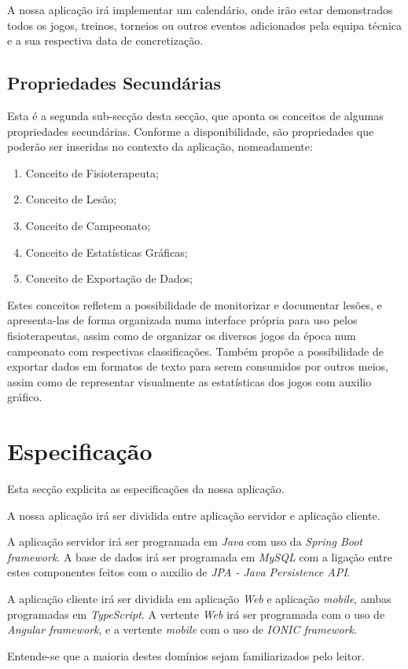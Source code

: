 A nossa aplicação irá implementar um calendário, onde irão estar demonstrados todos os jogos, treinos, torneios ou outros eventos adicionados pela equipa técnica e a sua respectiva data de concretização.



\subsection{Propriedades Secundárias} \label{sec222}
Esta é a segunda sub-secção desta secção, que aponta os conceitos de algumas propriedades secundárias. Conforme a disponibilidade, são propriedades que poderão ser inseridas no contexto da aplicação, nomeadamente:
\begin{enumerate}
	\item Conceito de Fisioterapeuta;
	\item Conceito de Lesão;
	\item Conceito de Campeonato;
	\item Conceito de Estatísticas Gráficas;
	\item Conceito de Exportação de Dados;
\end{enumerate}

Estes conceitos refletem a possibilidade de monitorizar e documentar lesões, e apresenta-las de forma organizada numa interface própria para uso pelos fisioterapeutas, assim como de organizar os diversos jogos da época num campeonato com respectivas classificações. Também propõe a possibilidade de exportar dados em formatos de texto para serem consumidos por outros meios, assim como de representar visualmente as estatísticas dos jogos com auxilio gráfico.

\section{Especificação}\label{sec23}
Esta secção explicita as especificações da nossa aplicação.

A nossa aplicação irá ser dividida entre aplicação servidor e aplicação cliente.

A aplicação servidor irá ser programada em \emph{Java} com uso da \emph{Spring Boot framework}. A base de dados irá ser programada em \emph{MySQL} com a ligação entre estes componentes feitos com o auxilio de \emph{JPA - Java Persistence API}.

A aplicação cliente irá ser dividida em aplicação \emph{Web} e aplicação \emph{mobile}, ambas programadas em \emph{TypeScript}. A vertente \emph{Web} irá ser programada com o uso de \emph{Angular framework}, e a vertente \emph{mobile} com o uso de \emph{IONIC framework}.

Entende-se que a maioria destes domínios sejam familiarizados pelo leitor.

